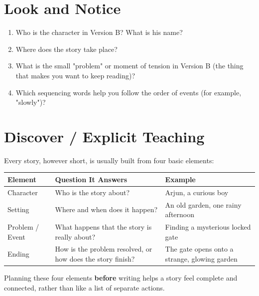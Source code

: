 \section{Look and Notice}
\begin{thinkbox}
\begin{enumerate}
    \item Who is the character in Version B? What is his name?
    \item Where does the story take place?
    \item What is the small "problem" or moment of tension in Version B (the thing that makes you want to keep reading)?
    \item Which sequencing words help you follow the order of events (for example, "slowly")?
\end{enumerate}
\end{thinkbox}

\section{Discover / Explicit Teaching}
Every story, however short, is usually built from four basic elements:

\begin{table}[h!]
\centering
\begin{tabular}{|l|p{4cm}|p{5cm}|}
\hline
\textbf{Element} & \textbf{Question It Answers} & \textbf{Example} \\
\hline
Character & Who is the story about? & Arjun, a curious boy \\
Setting & Where and when does it happen? & An old garden, one rainy afternoon \\
Problem / Event & What happens that the story is really about? & Finding a mysterious locked gate \\
Ending & How is the problem resolved, or how does the story finish? & The gate opens onto a strange, glowing garden \\
\hline
\end{tabular}
\end{table}

Planning these four elements \textbf{before} writing helps a story feel complete and connected, rather than like a list of separate actions.

